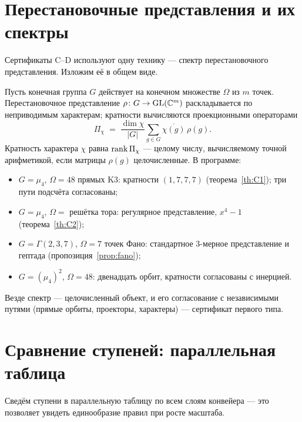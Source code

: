\section{Перестановочные представления и их спектры}\label{sec:permspec}

Сертификаты C--D используют одну технику --- спектр
перестановочного представления. Изложим её в общем виде.

Пусть конечная группа $G$ действует на конечном множестве
$\Omega$ из $m$ точек. Перестановочное представление
$\rho\colon G\to\mathrm{GL}(\mathbb{C}^m)$ раскладывается по неприводимым
характерам; кратности вычисляются проекционными операторами
\[
  \Pi_\chi \;=\; \frac{\dim\chi}{|G|}
  \sum_{g\in G}\overline{\chi(g)}\,\rho(g).
\]
Кратность характера $\chi$ равна $\operatorname{rank}\Pi_\chi$ --- целому числу,
вычисляемому точной арифметикой, если матрицы $\rho(g)$
целочисленные. В программе:
\begin{itemize}[leftmargin=1.6em, itemsep=0.1em]
\item $G=\mu_4$, $\Omega=48$ прямых K3: кратности $(1,7,7,7)$
  (теорема~\ref{th:C1}); три пути подсчёта согласованы;
\item $G=\mu_4$, $\Omega=$ решётка тора: регулярное представление,
  $x^4-1$ (теорема~\ref{th:C2});
\item $G=\Gamma(2,3,7)$, $\Omega=7$ точек Фано: стандартное
  $3$-мерное представление и гептада (пропозиция~\ref{prop:fano});
\item $G=(\mu_4)^2$, $\Omega=48$: двенадцать орбит, кратности
  согласованы с инерцией.
\end{itemize}
Везде спектр --- целочисленный объект, и его согласование с
независимыми путями (прямые орбиты, проекторы, характеры) ---
сертификат первого типа.

\section{Сравнение ступеней: параллельная таблица}\label{sec:compare}

Сведём ступени в параллельную таблицу по всем слоям конвейера ---
это позволяет увидеть единообразие правил при росте масштаба.

